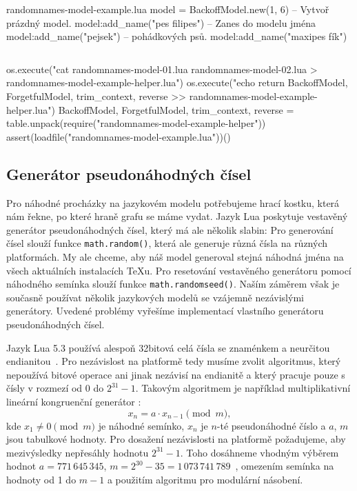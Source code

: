 \documentclass{csbulletin}
\newcommand\myinputminted[3][]{%
  \inputminted[#1]{#2}{#3}%
}
\newcommand\myinputminted[3][]{%
  \inputminted[#1]{#2}{code-placeholder.#2}%
}
\begin{document}
\begin{filecontents}{randomnames-model-example.lua}
model = BackoffModel.new(1, 6)        -- Vytvoř prázdný model.
model:add_name("pes filipes")         -- Zanes do modelu jména
model:add_name("pejsek")              -- pohádkových psů.
model:add_name("maxipes fík")
\end{filecontents}
\myinputminted[linenos=false]{lua}{randomnames-model-example.lua}

\noindent
\begin{luacode*}
os.execute("cat randomnames-model-01.lua randomnames-model-02.lua > randomnames-model-example-helper.lua")
os.execute("echo return {BackoffModel, ForgetfulModel, trim_context, reverse} >> randomnames-model-example-helper.lua")
BackoffModel, ForgetfulModel, trim_context, reverse = table.unpack(require("randomnames-model-example-helper"))
assert(loadfile("randomnames-model-example.lua"))()
\end{luacode*}

\subsection{Generátor pseudonáhodných čísel}
\label{sec:implementace-random}

Pro náhodné procházky na jazykovém modelu potřebujeme hrací kostku, která nám řekne, po které hraně grafu se máme vydat. Jazyk Lua poskytuje vestavěný generátor pseudonáhodných čísel, který má ale několik slabin: Pro generování čísel slouží funkce \texttt{math.random()}, která ale generuje různá čísla na různých platformách. My ale chceme, aby náš model generoval stejná náhodná jména na všech aktuálních instalacích \TeX u. Pro resetování vestavěného generátoru pomocí náhodného semínka slouží funkce \texttt{math.randomseed()}. Naším záměrem však je současně používat několik jazykových modelů se vzájemně nezávislými generátory. Uvedené problémy vyřešíme implementací vlastního generátoru pseudonáhodných čísel.

Jazyk Lua 5.3 používá alespoň 32bitová celá čísla se znaménkem a neurčitou endianitou~\cite[sekce~2.1]{ierusalimschy2020lua}. Pro nezávislost na platformě tedy musíme zvolit algoritmus, který nepoužívá bitové operace ani jinak nezávisí na endianitě a který pracuje pouze s čísly v rozmezí od 0 do $2^{31} - 1$. Takovým algoritmem je například multiplikativní lineární kongruenční generátor \cite[sekce~7.1]{press2007numerical}:
\begin{equation}
x_n = a\cdot x_{n-1}\pmod{m},
\end{equation}
kde $x_1\neq0\pmod{m}$ je náhodné semínko, $x_n$ je $n$-té pseudonáhodné číslo a $a$, $m$ jsou tabulkové hodnoty.
Pro dosažení nezávislosti na platformě požadujeme, aby mezivýsledky nepřesáhly hodnotu $2^{31} - 1$. Toho dosáhneme vhodným výběrem hodnot $a = 771\,645\,345$, $m = 2^{30} - 35 = 1\,073\,741\,789$~\cite[tabulka~2]{l1999tables}, omezením semínka na hodnoty od 1 do $m - 1$ a použitím algoritmu pro modulární násobení.
\end{document}
